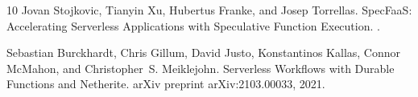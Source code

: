 \documentclass[10pt,twocolumn]{article}
\begin{document}
\begin{thebibliography}{10}
Jovan Stojkovic, Tianyin Xu, Hubertus Franke, and Josep Torrellas.
\newblock SpecFaaS: Accelerating Serverless Applications with Speculative Function Execution.
.

Sebastian Burckhardt, Chris Gillum, David Justo, Konstantinos Kallas, Connor McMahon, and Christopher~S. Meiklejohn.
\newblock Serverless Workflows with Durable Functions and Netherite.
\newblock arXiv preprint arXiv:2103.00033, 2021.

\end{thebibliography}
\end{document}
